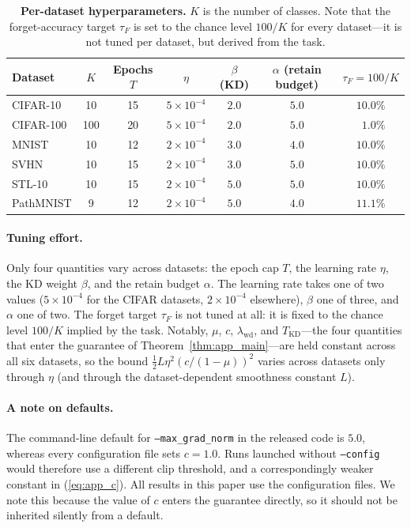 \documentclass{article}
\theoremstyle{remark}
\theoremstyle{plain}
\begin{document}
\begin{table}[t]
\centering
\caption{\textbf{Per-dataset hyperparameters.} $K$ is the number of classes.
Note that the forget-accuracy target $\tau_F$ is set to the chance level
$100/K$ for every dataset---it is not tuned per dataset, but derived from the
task.}
\label{tab:app_perdataset}
\begin{tabular}{@{}lcccccc@{}}
\toprule
Dataset & $K$ & Epochs $T$ & $\eta$ & $\beta$ (KD) & $\alpha$ (retain budget) & $\tau_F = 100/K$ \\
\midrule
CIFAR-10  & 10  & 15 & $5\times10^{-4}$ & $2.0$ & $5.0$ & $10.0\%$ \\
CIFAR-100 & 100 & 20 & $5\times10^{-4}$ & $2.0$ & $5.0$ & $\phantom{0}1.0\%$ \\
MNIST     & 10  & 12 & $2\times10^{-4}$ & $3.0$ & $4.0$ & $10.0\%$ \\
SVHN      & 10  & 15 & $2\times10^{-4}$ & $3.0$ & $5.0$ & $10.0\%$ \\
STL-10    & 10  & 15 & $2\times10^{-4}$ & $5.0$ & $5.0$ & $10.0\%$ \\
PathMNIST & \phantom{0}9 & 12 & $2\times10^{-4}$ & $5.0$ & $4.0$ & $11.1\%$ \\
\bottomrule
\end{tabular}
\end{table}

\paragraph{Tuning effort.}
Only four quantities vary across datasets: the epoch cap $T$, the learning rate
$\eta$, the KD weight $\beta$, and the retain budget $\alpha$. The learning rate
takes one of two values ($5\times10^{-4}$ for the CIFAR datasets,
$2\times10^{-4}$ elsewhere), $\beta$ one of three, and $\alpha$ one of two. The
forget target $\tau_F$ is not tuned at all: it is fixed to the chance level
$100/K$ implied by the task. Notably, $\mu$, $c$, $\lambda_{\mathrm{wd}}$, and
$T_{\mathrm{KD}}$---the four quantities that enter the guarantee of
Theorem~\ref{thm:app_main}---are held constant across all six datasets, so the
bound $\tfrac12 L\eta^2(c/(1-\mu))^2$ varies across datasets only through
$\eta$ (and through the dataset-dependent smoothness constant $L$).

\paragraph{A note on defaults.}
The command-line default for \texttt{--max\_grad\_norm} in the released code is
$5.0$, whereas every configuration file sets $c=1.0$. Runs launched without
\texttt{--config} would therefore use a different clip threshold, and a
correspondingly weaker constant in
(\ref{eq:app_c}). All results in this paper use the configuration files. We note
this because the value of $c$ enters the guarantee directly, so it should not be
inherited silently from a default.
\end{document}
